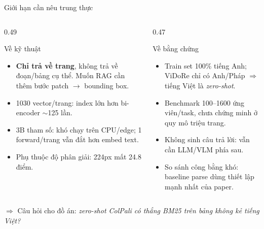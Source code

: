 \documentclass[aspectratio=169,10pt]{beamer}
\begin{document}
\begin{frame}{Giới hạn cần nêu trung thực}
  \begin{columns}[T]
    \begin{column}{0.49\textwidth}
      \begin{block}{\small Về kỹ thuật}
        \footnotesize
        \begin{itemize}
          \item \textbf{Chỉ trả về trang}, không trả về đoạn/bảng cụ thể. Muốn RAG cần thêm bước patch $\rightarrow$ bounding box.
          \item 1030 vector/trang: index lớn hơn bi-encoder $\sim$125 lần.
          \item 3B tham số: khó chạy trên CPU/edge; 1 forward/trang vẫn đắt hơn embed text.
          \item Phụ thuộc độ phân giải: 224px mất 24.8 điểm.
        \end{itemize}
      \end{block}
    \end{column}
    \begin{column}{0.47\textwidth}
      \begin{block}{\small Về bằng chứng}
        \footnotesize
        \begin{itemize}
          \item Train set 100\% tiếng Anh; ViDoRe chỉ có Anh/Pháp $\Rightarrow$ tiếng Việt là \emph{zero-shot}.
          \item Benchmark 100--1600 ứng viên/task, chưa chứng minh ở quy mô triệu trang.
          \item Không sinh câu trả lời: vẫn cần LLM/VLM phía sau.
          \item So sánh công bằng khó: baseline parse dùng thiết lập mạnh nhất của paper.
        \end{itemize}
      \end{block}
    \end{column}
  \end{columns}

  \vspace{1mm}
  \begin{center}
    \footnotesize
    $\Rightarrow$ Câu hỏi cho đồ án: \emph{zero-shot ColPali có thắng BM25 trên bảng không kẻ tiếng Việt?}
  \end{center}
\end{frame}
\end{document}
